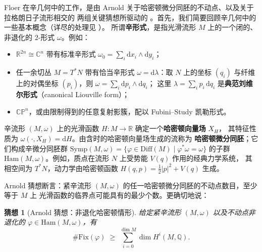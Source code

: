 \documentclass[UTF8,a4paper,11pt,fontset=windows]{ctexart}
\theoremstyle{cnthm}
\newtheorem{conj}[thm]{猜想}
\numberwithin{equation}{section}
\newcommand{\C}{\mathbb{C}}
\newcommand{\R}{\mathbb{R}}
\newcommand{\Q}{\mathbb{Q}}
\newcommand{\CP}{\mathbb{CP}}
\begin{document}
Floer 在辛几何中的工作，是由 Arnold 关于哈密顿微分同胚的不动点、以及关于拉格朗日子流形相交的
两组关键猜想所驱动的 \cite{r16}。首先，我们简要回顾辛几何中的一些基本概念（详尽的处理见 \cite{r30}）。
所谓\textbf{辛形式}，是指光滑流形 $M$ 上的一个闭的、非退化的 $2$-形式 $\omega$。例如：
\begin{itemize}[leftmargin=1.6em,itemsep=1pt,topsep=2pt]
  \item $\R^{2n}\cong\C^{n}$ 带有标准辛形式 $\omega_0=\sum_i \mathrm{d}x_i\wedge\mathrm{d}y_i$；
  \item 任一余切丛 $M=T^{*}N$ 带有恰当辛形式 $\omega=\mathrm{d}\lambda$：取 $N$ 上的坐标 $(q_i)$
        与纤维上的对偶坐标 $(p_i)$，则 $\omega=\sum_i \mathrm{d}p_i\wedge\mathrm{d}q_i$；
        这里 $\lambda=\sum_i p_i\,\mathrm{d}q_i$ 是\textbf{典范刘维尔形式}（canonical Liouville form）；
  \item $\CP^{n}$，或由限制得到的任意复射影簇，配以 Fubini--Study 凯勒形式。
\end{itemize}

辛流形 $(M,\omega)$ 上的光滑函数 $H:M\to\R$ 确定一个\textbf{哈密顿向量场} $X_H$，
其特征性质为 $\omega(\cdot,X_H)=\mathrm{d}H$。由含时的哈密顿向量场生成的流称为
\textbf{哈密顿微分同胚}；它们构成辛微分同胚群
$\mathrm{Symp}(M,\omega)=\{\varphi\in\mathrm{Diff}(M)\mid \varphi^{*}\omega=\omega\}$
的子群 $\mathrm{Ham}(M,\omega)$。例如，质点在流形 $N$ 上受势能 $V(q)$ 作用的经典力学系统，
其相空间为 $T^{*}N$，动力学由哈密顿函数 $H(q,p)=\tfrac12|p|^{2}+V(q)$ 生成。

Arnold 猜想断言：紧辛流形 $(M,\omega)$ 的任一哈密顿微分同胚的不动点数目，至少等于 $M$ 上
光滑函数的临界点可能具有的最少个数。更确切地说：

\begin{conj}[Arnold 猜想：非退化哈密顿情形]\label{conj:arnold}
给定紧辛流形 $(M,\omega)$ 以及不动点非退化的 $\varphi\in\mathrm{Ham}(M,\omega)$，有
\begin{equation}\label{eq:1.1}
\#\mathrm{Fix}(\varphi)\;\ge\;\sum_{i=0}^{\dim M}\dim H^{i}(M,\Q).
\end{equation}
\end{conj}
\end{document}
